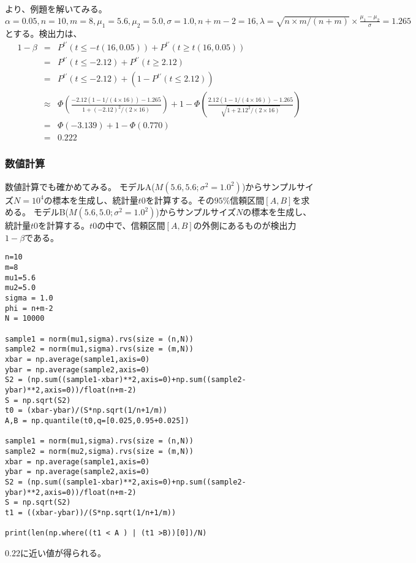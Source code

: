 \cite{2003サンプルサイズの決め方}より、例題を解いてみる。
$\alpha=0.05,n=10,m=8,\mu_1=5.6,\mu_2=5.0,\sigma=1.0,n+m-2 = 16,\lambda=\sqrt{n\times m/(n+m)} \times \frac{\mu_1-\mu_2}{\sigma} = 1.265 $とする。検出力は、
\begin{eqnarray*}
    1-\beta &=& P^{t'}(t \leq -t(16,0.05))+P^{t'}(t \geq t(16,0.05)) \\
    &=& P^{t'}(t \leq -2.12)+P^{t'}(t\geq 2.12) \\
    &=& P^{t'}(t \leq -2.12)+(1-P^{t'}(t\leq 2.12)) \\
    &\approx& \varPhi(\frac{-2.12(1-1/(4\times 16))-1.265}{1+(-2.12)^2/(2\times 16)}) +1-\varPhi(\frac{2.12(1-1/(4\times 16))-1.265}{\sqrt{1+2.12^2/(2\times 16)}}) \\
    &=& \varPhi(-3.139)+1-\varPhi(0.770) \\
    &=& 0.222
\end{eqnarray*}

\subsubsection*{数値計算}
数値計算でも確かめてみる。
モデルA($M(5.6,5.6;\sigma^2=1.0^2)$)からサンプルサイズ$N=10^4$の標本を生成し、統計量$t0$を計算する。その$95\%$信頼区間$[A,B]$を求める。
モデルB($M(5.6,5.0;\sigma^2=1.0^2)$)からサンプルサイズ$N$の標本を生成し、統計量$t0$を計算する。$t0$の中で、信頼区間$[A,B]$の外側にあるものが検出力$1-\beta$である。

\begin{lstlisting}
n=10
m=8
mu1=5.6
mu2=5.0
sigma = 1.0
phi = n+m-2
N = 10000

sample1 = norm(mu1,sigma).rvs(size = (n,N))
sample2 = norm(mu1,sigma).rvs(size = (m,N))
xbar = np.average(sample1,axis=0)
ybar = np.average(sample2,axis=0)
S2 = (np.sum((sample1-xbar)**2,axis=0)+np.sum((sample2-ybar)**2,axis=0))/float(n+m-2)
S = np.sqrt(S2)
t0 = (xbar-ybar)/(S*np.sqrt(1/n+1/m))
A,B = np.quantile(t0,q=[0.025,0.95+0.025])

sample1 = norm(mu1,sigma).rvs(size = (n,N))
sample2 = norm(mu2,sigma).rvs(size = (m,N))
xbar = np.average(sample1,axis=0)
ybar = np.average(sample2,axis=0)
S2 = (np.sum((sample1-xbar)**2,axis=0)+np.sum((sample2-ybar)**2,axis=0))/float(n+m-2)
S = np.sqrt(S2)
t1 = ((xbar-ybar))/(S*np.sqrt(1/n+1/m))

print(len(np.where((t1 < A ) | (t1 >B))[0])/N)    
\end{lstlisting}
$0.22$に近い値が得られる。



